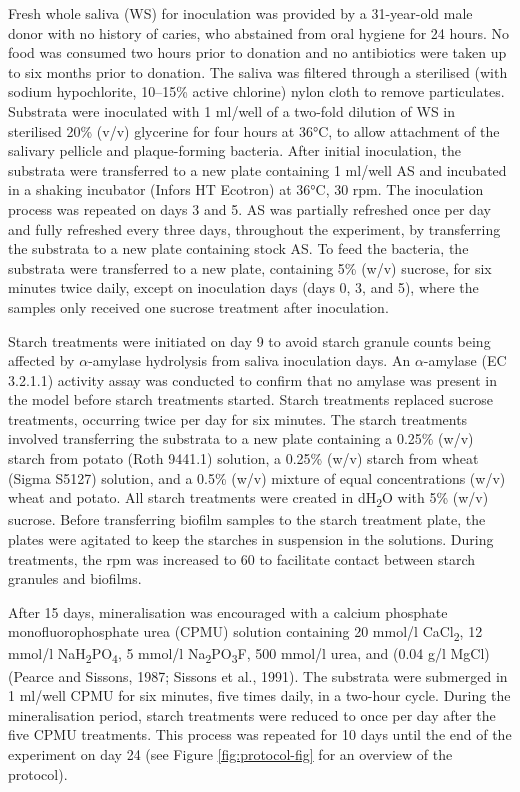 \documentclass[utf8]{frontiers/frontiersSCNS}
\begin{document}
Fresh whole saliva (WS) for inoculation was provided by a 31-year-old male donor
with no history of caries, who abstained from oral hygiene for 24 hours. No
food was consumed two hours prior to donation and no antibiotics were taken up
to six months prior to donation.
The saliva was filtered through a sterilised (with sodium hypochlorite, 10--15\% active chlorine)
nylon cloth to remove particulates.
Substrata were inoculated with 1 ml/well of a two-fold dilution of WS in sterilised
20\% (v/v) glycerine for four hours at 36°C, to allow attachment of the
salivary pellicle and plaque-forming bacteria. After initial inoculation, the
substrata were transferred to a new plate containing 1 ml/well AS and incubated
in a shaking incubator (Infors HT Ecotron) at 36°C, 30 rpm.
The inoculation process was repeated on days 3 and 5.
AS was partially refreshed once per day and fully refreshed every three days,
throughout the experiment, by transferring the substrata to a new plate containing
stock AS. To feed the bacteria, the substrata were transferred to a new plate, containing
5\% (w/v) sucrose, for six minutes twice daily, except on inoculation days
(days 0, 3, and 5), where the samples only received one sucrose treatment after
inoculation.

Starch treatments were initiated on day 9 to avoid starch granule counts being
affected by \(\alpha\)-amylase hydrolysis from saliva inoculation days.
An \(\alpha\)-amylase (EC 3.2.1.1) activity
assay was conducted to confirm that no amylase was present in the model before
starch treatments started. Starch treatments replaced sucrose treatments, occurring twice per day
for six minutes. The starch treatments involved transferring the substrata to a
new plate containing a 0.25\% (w/v) starch from potato (Roth 9441.1) solution, a 0.25\% (w/v) starch from wheat (Sigma S5127) solution, and a 0.5\% (w/v) mixture of equal
concentrations (w/v) wheat and potato. All starch treatments were created in dH\textsubscript{2}O
with 5\% (w/v) sucrose. Before transferring biofilm samples to the starch treatment
plate, the plates were agitated to keep the starches in suspension in the
solutions. During treatments, the rpm was increased to 60 to facilitate contact
between starch granules and biofilms.

After 15 days, mineralisation was encouraged with a
calcium phosphate monofluorophosphate urea (CPMU) solution containing
20 mmol/l CaCl\textsubscript{2}, 12 mmol/l NaH\textsubscript{2}PO\textsubscript{4}, 5 mmol/l Na\textsubscript{2}PO\textsubscript{3}F, 500 mmol/l urea,
and (0.04 g/l MgCl)
(Pearce and Sissons, 1987; Sissons et al., 1991).
The substrata were submerged in 1 ml/well CPMU for six minutes, five times
daily, in a two-hour cycle. During the mineralisation period, starch treatments
were reduced to once per day after the five CPMU treatments. This process was repeated
for 10 days until the end of the experiment on day 24
(see Figure \ref{fig:protocol-fig} for an overview of the protocol).
\end{document}
